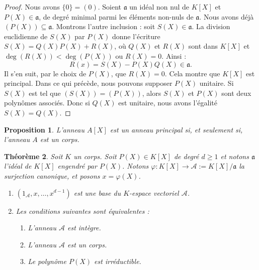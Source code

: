 \documentclass[a4paper, titlepage]{article}
\newtheorem{theo}{Théorème}[section]
\newtheorem{prop}[theo]{Proposition}
\theoremstyle{definition}
\theoremstyle{remark}
\begin{document}
\begin{proof}
Nous avons $\{0\} = (0)$. Soient $\mathfrak{a}$ un idéal non nul de $K[X]$ et $P(X) \in \mathfrak{a}$, de degré minimal parmi les éléments non-nuls de $\mathfrak{a}$. Nous avons déjà $(P(X)) \subseteq \mathfrak{a}$. Montrons l'autre inclusion : soit $S(X) \in \mathfrak{a}$. La division euclidienne de $S(X)$ par $P(X)$ donne l'écriture $S(X) = Q(X)P(X) + R(X)$, où $Q(X)$ et $R(X)$ sont dans $K[X]$ et $\deg(R(X))< \deg(P(X))$ ou $R(X) = 0$. Ainsi : $$R(x) = S(X) - P(X)Q(X) \in \mathfrak{a}.$$
Il s'en suit, par le choix de $P(X)$, que $R(X) = 0$. Cela montre que $K[X]$ est principal. Dans ce qui précède, nous pouvons supposer $P(X)$ unitaire. Si $S(X)$ est tel que $(S(X)) = (P(X))$, alors $S(X)$ et $P(X)$ sont deux polynômes associés. Donc si $Q(X)$ est unitaire, nous avons l'égalité $S(X) = Q(X)$.
\end{proof}

\begin{prop}
L'anneau $A[X]$ est un anneau principal si, et seulement si, l'anneau $A$ est un corps.
\end{prop}

\begin{theo}\label{theoSurjecAnnPoly}
Soit $K$ un corps. Soit $P(X) \in K[X]$ de degré $d \geqslant 1$ et notons $\mathfrak{a}$ l'idéal de $K[X]$ engendré par $P(X)$. Notons $\varphi: K[X] \rightarrow \mathcal{A} := K[X] / \mathfrak{a}$ la surjection canonique, et posons $x = \varphi(X)$. \begin{enumerate}
\item $(1_\mathcal{A}, x, \dots, x^{d-1})$ est une base du $K$-espace vectoriel $\mathcal A$.
\item Les conditions suivantes sont équivalentes : \begin{enumerate}
\item L'anneau $\mathcal{A}$ est intègre.
\item L'anneau $\mathcal{A}$ est un corps.
\item Le polynôme $P(X)$ est irréductible.
\end{enumerate}
\end{enumerate}
\end{theo}
\end{document}
